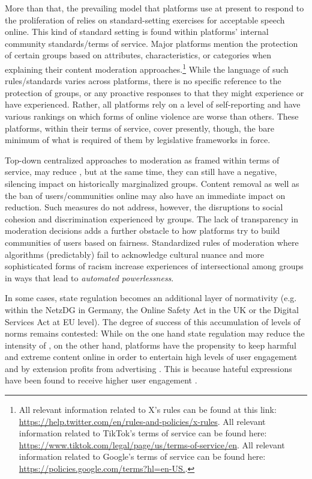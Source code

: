 \documentclass[output=paper,colorlinks,citecolor=brown]{langscibook}
\begin{document}
More than that, the prevailing model that platforms use at present to respond to the proliferation of  relies on standard-setting exercises for acceptable speech online. This kind of standard setting is found within platforms' internal community standards/terms of service. Major platforms mention the protection of certain groups based on attributes, characteristics, or categories when explaining their content moderation approaches.\footnote{%
All relevant information related to X's rules can be found at this link: \url{https://help.twitter.com/en/rules-and-policies/x-rules}. All relevant information related to TikTok's terms of service can be found here: \url{https://www.tiktok.com/legal/page/us/terms-of-service/en}. All relevant information related to Google's terms of service can be found here: \url{https://policies.google.com/terms?hl=en-US.}.} 
While the language of such rules/standards varies across platforms, there is no specific reference to the protection of  groups, or any proactive responses to  that they might experience or have experienced. Rather, all platforms rely on a level of self-reporting and have various rankings on which forms of online violence are worse than others. These platforms, within their terms of service, cover presently, though, the bare minimum of what is required of them by legislative frameworks in force.

Top-down centralized approaches to moderation as framed within terms of service, may reduce , but at the same time, they can still have a negative, silencing impact on historically marginalized groups. Content removal as well as the ban of users/communities online may also have an immediate impact on  reduction. Such measures do not address, however, the disruptions to social cohesion and discrimination experienced by  groups. The lack of transparency in moderation decisions adds a further obstacle to how platforms try to build communities of users based on fairness. Standardized rules of moderation where algorithms (predictably) fail to acknowledge cultural nuance and more sophisticated forms of racism increase experiences of intersectional  among  groups in ways that lead to \textit{automated powerlessness}.

In some cases, state regulation becomes an additional layer of normativity (e.g. within the NetzDG in Germany, the Online Safety Act in the UK or the Digital Services Act at EU level). The degree of success of this accumulation of levels of norms remains contested: While on the one hand state regulation may reduce the intensity of  \citep{andres_slivko2023}, on the other hand, platforms have the propensity to keep harmful and extreme content online in order to entertain high levels of user engagement and by extension profits from advertising \citep{liu_yildirim_zhang2021}. This is because hateful expressions have been found to receive higher user engagement \citep{mallipeddi_janakiraman_kumar_gupta2021}.
\end{document}
